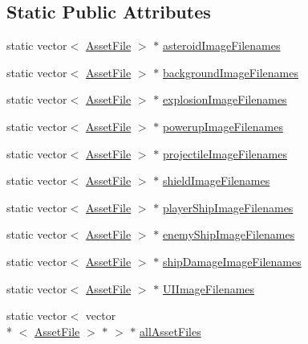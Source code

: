 \subsection*{Static Public Attributes}
\begin{DoxyCompactItemize}
\item 
static vector$<$ \hyperlink{struct_asset_file}{Asset\-File} $>$ $\ast$ \hyperlink{struct_asset_file_a7482e097719d1baa3a15fc3a5a00e15e}{asteroid\-Image\-Filenames}
\item 
static vector$<$ \hyperlink{struct_asset_file}{Asset\-File} $>$ $\ast$ \hyperlink{struct_asset_file_a54cd19685e8f404021aeef79eb775430}{background\-Image\-Filenames}
\item 
static vector$<$ \hyperlink{struct_asset_file}{Asset\-File} $>$ $\ast$ \hyperlink{struct_asset_file_a71a63898ce62bf0afc9fc1e8736cfb1d}{explosion\-Image\-Filenames}
\item 
static vector$<$ \hyperlink{struct_asset_file}{Asset\-File} $>$ $\ast$ \hyperlink{struct_asset_file_afcf268447c77710c71d5503668e0afb7}{powerup\-Image\-Filenames}
\item 
static vector$<$ \hyperlink{struct_asset_file}{Asset\-File} $>$ $\ast$ \hyperlink{struct_asset_file_aa4c45964db96750b68dc082ccbd6adb3}{projectile\-Image\-Filenames}
\item 
static vector$<$ \hyperlink{struct_asset_file}{Asset\-File} $>$ $\ast$ \hyperlink{struct_asset_file_a190e00509710ab08fa4effe17ef443f0}{shield\-Image\-Filenames}
\item 
static vector$<$ \hyperlink{struct_asset_file}{Asset\-File} $>$ $\ast$ \hyperlink{struct_asset_file_a2e2753d8110ad1c4726f724e15f5b831}{player\-Ship\-Image\-Filenames}
\item 
static vector$<$ \hyperlink{struct_asset_file}{Asset\-File} $>$ $\ast$ \hyperlink{struct_asset_file_a792cd746ec7903ca9d34a094627bc947}{enemy\-Ship\-Image\-Filenames}
\item 
static vector$<$ \hyperlink{struct_asset_file}{Asset\-File} $>$ $\ast$ \hyperlink{struct_asset_file_a372beb61728cbc13001766c79ab1ee70}{ship\-Damage\-Image\-Filenames}
\item 
static vector$<$ \hyperlink{struct_asset_file}{Asset\-File} $>$ $\ast$ \hyperlink{struct_asset_file_a453cc790da71efe1ad15a45d1a3cde40}{U\-I\-Image\-Filenames}
\item 
static vector$<$ vector\\*
$<$ \hyperlink{struct_asset_file}{Asset\-File} $>$ $\ast$ $>$ $\ast$ \hyperlink{struct_asset_file_a9bd02c38dcc2dc973d65b92c80d35570}{all\-Asset\-Files}
\end{DoxyCompactItemize}
